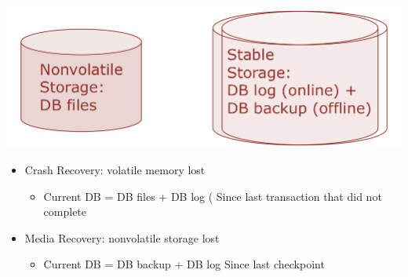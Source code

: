 \includegraphics[scale=0.15]{graphics/recovery-eq.png}

\begin{itemize}
\item Crash Recovery: volatile memory lost
  \begin{itemize}
  \item Current DB = DB files + DB log
    ({\color{red} Since last transaction that did not complete}
  \end{itemize}

\item Media Recovery: nonvolatile storage lost
  \begin{itemize}
  \item Current DB = DB backup + DB log
    {\color{red} Since last checkpoint}
  \end{itemize}
\end{itemize}

